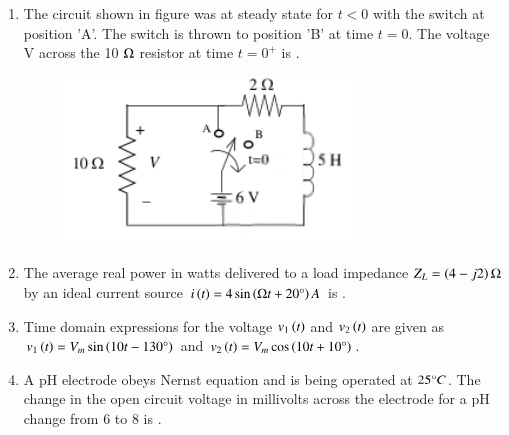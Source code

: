 \documentclass[journal,12pt,onecolumn]{IEEEtran}
\theoremstyle{remark}
\begin{document}
\begin{enumerate}
    \item The circuit shown in figure was at steady state for $t < 0$ with the switch at position 'A'. The switch is thrown to position 'B' at time $t = 0$. The voltage V  across the 10 $\ohm$ resistor at time $t=0^+$ is \underline{\hspace{2cm}}.
    \begin{figure}[H]
        \centering
        \includegraphics[width=0.4\columnwidth]{q6}
        \caption*{}
        \label{fig:q6}
    \end{figure}

    \hfill{}

    \item The average real power in watts delivered to a load impedance $Z_L = \left(4 - j2\right)\ohm$ by an ideal current source $i\left(t\right) = 4 \sin\left(\ohm t + 20\degree\right) A$ is \underline{\hspace{2cm}}.

    \hfill{}

    
    
    \item Time domain expressions for the voltage $v_1\left(t\right)$ and $v_2\left(t\right)$ are given as $v_1\left(t\right) = V_m \sin\left(10t - 130\degree\right)$ and $v_2\left(t\right) = V_m \cos\left(10t + 10\degree\right)$.
    
    \hfill{}
        \begin{enumerate}
        \end{enumerate}

    \item A pH electrode obeys Nernst equation and is being operated at $25\degree C$. The change in the open circuit voltage in millivolts across the electrode for a pH change from 6 to 8 is \underline{\hspace{2cm}}.


\end{enumerate}
\end{document}

